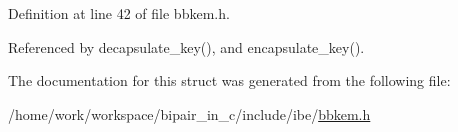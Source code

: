 Definition at line 42 of file bbkem.\-h.



Referenced by decapsulate\-\_\-key(), and encapsulate\-\_\-key().



The documentation for this struct was generated from the following file\-:\begin{DoxyCompactItemize}
\item 
/home/work/workspace/bipair\-\_\-in\-\_\-c/include/ibe/\hyperlink{bbkem_8h}{bbkem.\-h}\end{DoxyCompactItemize}
